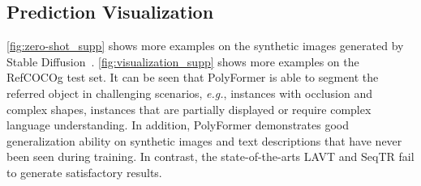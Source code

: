 \subsection{Prediction Visualization}
 \cref{fig:zero-shot_supp} shows more examples on the synthetic images generated by Stable Diffusion~\cite{rombach2021highresolution}. \cref{fig:visualization_supp} shows more examples on the RefCOCOg test set. It can be seen that PolyFormer is able to segment the referred object in challenging scenarios, \textit{e.g.}, instances with occlusion and complex shapes, instances that are partially displayed or require complex language understanding. In addition, PolyFormer demonstrates good generalization ability on synthetic images and text descriptions that have never been seen during training. In contrast, the state-of-the-arts LAVT \cite{yang2022lavt} and SeqTR \cite{zhu2022seqtr} fail to generate satisfactory results. 


